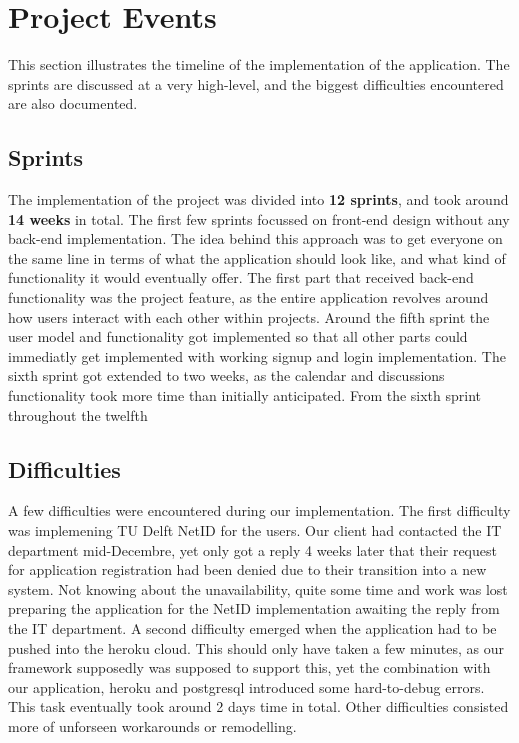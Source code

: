 \section{Project Events}

This section illustrates the timeline of the implementation of the application. The sprints are discussed at a very high-level, and
the biggest difficulties encountered are also documented.

\subsection{Sprints}

The implementation of the project was divided into \textbf{12 sprints}, and took around \textbf{14 weeks} in total. 
The first few sprints focussed on front-end design without any back-end implementation. The idea
behind this approach was to get everyone on the same line in terms of what the application should look like, and
what kind of functionality it would eventually offer. 
The first part that received back-end functionality was the project feature, as the entire application
revolves around how users interact with each other within projects.
Around the fifth sprint the user model and functionality got implemented so that all other parts could immediatly
get implemented with working signup and login implementation.
The sixth sprint got extended to two weeks, as the calendar and discussions functionality took more time than initially
anticipated. From the sixth sprint throughout the twelfth

\subsection{Difficulties}

A few difficulties were encountered during our implementation. The first difficulty was implemening TU Delft
NetID for the users. Our client had contacted the IT department mid-Decembre, yet only got a reply 4 weeks later
that their request for application registration had been denied due to their transition into a new system. Not
knowing about the unavailability, quite some time and work was lost preparing the application for the NetID implementation
awaiting the reply from the IT department.
A second difficulty emerged when the application had to be pushed into the heroku cloud. This should only have taken a few minutes,
as our framework supposedly was supposed to support this, yet the combination with our application, heroku and postgresql
introduced some hard-to-debug errors. This task eventually took around 2 days time in total.
Other difficulties consisted more of unforseen workarounds or remodelling.